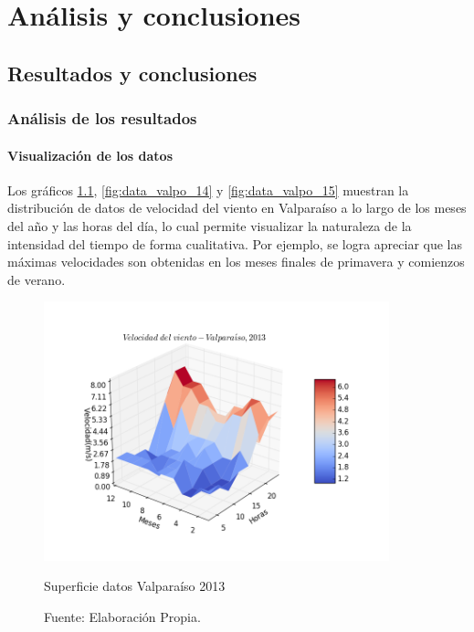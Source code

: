 
\chapter{Análisis y conclusiones}

\section{Resultados y conclusiones}
\subsection{Análisis de los resultados}
\subsubsection{Visualización de los datos}
Los gráficos \ref{fig:data_valpo_13}, \ref{fig:data_valpo_14} y \ref{fig:data_valpo_15} muestran la distribución de datos de velocidad del viento en Valparaíso a lo largo de los meses del año y las horas del día, lo cual permite visualizar la naturaleza de la intensidad del tiempo de forma cualitativa.
Por ejemplo, se logra apreciar que las máximas velocidades son obtenidas en los meses finales de primavera y comienzos de verano.\\
\begin{figure}[H]
    \centering
    \includegraphics[height=75mm]{figures/3d_data_2013.png}
    \caption{Superficie datos Valparaíso 2013}
    \vspace{-.25cm}
    \caption*{Fuente: Elaboración Propia.}
    \label{fig:data_valpo_13}
\end{figure}
